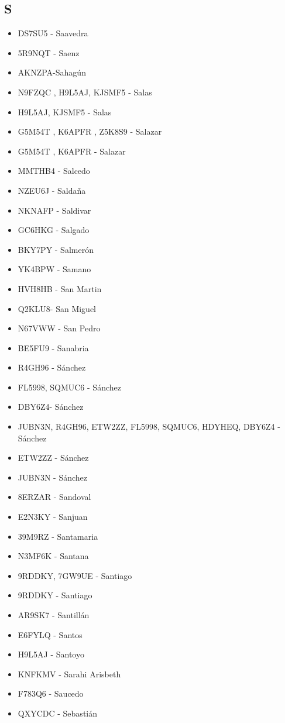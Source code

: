 \subsection*{S}
\begin{itemize}[leftmargin=*,nosep]
\item DS7SU5  -  Saavedra
\item 5R9NQT - Saenz
\item AKNZPA-Sahagún
\item N9FZQC , H9L5AJ, KJSMF5 - Salas
\item H9L5AJ, KJSMF5 - Salas
\item G5M54T , K6APFR , Z5K8S9 - Salazar
\item G5M54T , K6APFR -  Salazar
\item MMTHB4  -  Salcedo
\item NZEU6J  -  Saldaña
\item NKNAFP - Saldivar
\item GC6HKG  -  Salgado
\item BKY7PY - Salmerón
\item YK4BPW - Samano
\item HVH8HB - San Martin
\item Q2KLU8- San Miguel
\item N67VWW - San Pedro
\item BE5FU9 - Sanabria
\item R4GH96 - Sánchez
\item FL5998, SQMUC6 -  Sánchez
\item DBY6Z4- Sánchez
\item JUBN3N, R4GH96, ETW2ZZ, FL5998, SQMUC6, HDYHEQ, DBY6Z4 - Sánchez
\item ETW2ZZ  -  Sánchez
\item JUBN3N - Sánchez
\item 8ERZAR - Sandoval
\item E2N3KY - Sanjuan
\item 39M9RZ - Santamaria
\item N3MF6K - Santana
\item 9RDDKY, 7GW9UE - Santiago
\item 9RDDKY  -  Santiago
\item AR9SK7 - Santillán
\item E6FYLQ  -  Santos
\item H9L5AJ - Santoyo
\item KNFKMV - Sarahi Arisbeth
\item F783Q6 - Saucedo
\item QXYCDC - Sebastián

\end{itemize}
